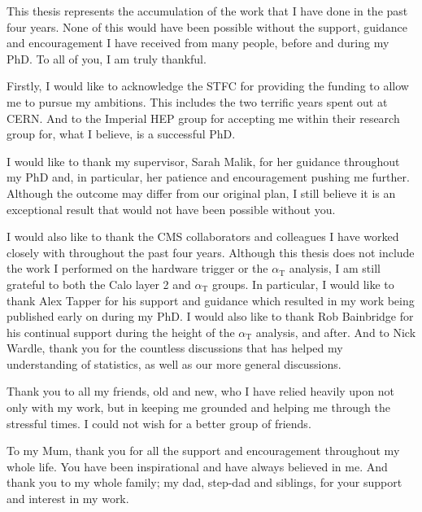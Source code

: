 \begin{acknowledgements}

This thesis represents the accumulation of the work that I have done in the past four years. None of this would have been possible without the support, guidance and encouragement I have received from many people, before and during my PhD. To all of you, I am truly thankful.

Firstly, I would like to acknowledge the STFC for providing the funding to allow me to pursue my ambitions. This includes the two terrific years spent out at CERN. And to the Imperial HEP group for accepting me within their research group for, what I believe, is a successful PhD.

I would like to thank my supervisor, Sarah Malik, for her guidance throughout my PhD and, in particular, her patience and encouragement pushing me further. Although the outcome may differ from our original plan, I still believe it is an exceptional result that would not have been possible without you.

I would also like to thank the CMS collaborators and colleagues I have worked closely with throughout the past four years. Although this thesis does not include the work I performed on the hardware trigger or the $\alpha_{\mathrm{T}}$ analysis, I am still grateful to both the Calo layer 2 and $\alpha_{\mathrm{T}}$ groups. In particular, I would like to thank Alex Tapper for his support and guidance which resulted in my work being published early on during my PhD. I would also like to thank Rob Bainbridge for his continual support during the height of the $\alpha_{\mathrm{T}}$ analysis, and after. And to Nick Wardle, thank you for the countless discussions that has helped my understanding of statistics, as well as our more general discussions.

Thank you to all my friends, old and new, who I have relied heavily upon not only with my work, but in keeping me grounded and helping me through the stressful times. I could not wish for a better group of friends.

To my Mum, thank you for all the support and encouragement throughout my whole life. You have been inspirational and have always believed in me. And thank you to my whole family; my dad, step-dad and siblings, for your support and interest in my work.

\end{acknowledgements}
